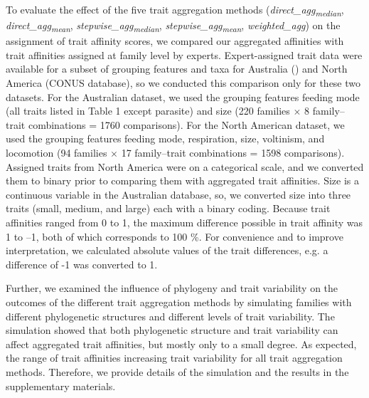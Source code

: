 \documentclass[12pt]{article}
\begin{document}
To evaluate the effect of the five trait aggregation methods
(\textit{direct\_agg\textsubscript{median}}, \textit{direct\_agg\textsubscript{mean}}, \textit{stepwise\_agg\textsubscript{median}}, \textit{stepwise\_agg\textsubscript{mean}}, \textit{weighted\_agg}) on the assignment of trait affinity scores, we compared our aggregated affinities with trait affinities assigned at family level by experts. Expert-assigned trait data were available for a subset of grouping features and taxa for Australia (\cite{chessman_dissolved-oxygen_2018}) and North America (CONUS database), so we conducted this comparison only for these two datasets. For the Australian dataset, we used the grouping features feeding mode (all traits listed in Table 1 except parasite) and size (220 families $\times$ 8 family–trait combinations = 1760 comparisons). For the North American dataset, we used the grouping features feeding mode, respiration, size, voltinism, and locomotion (94 families $\times$ 17 family–trait combinations = 1598 comparisons). Assigned traits from North America were on a categorical scale, and we converted them to binary prior to comparing them with aggregated trait affinities. Size is a continuous variable in the Australian database, so, we converted size into three traits (small, medium, and large) each with a binary coding. Because trait affinities ranged from 0 to 1, the maximum difference possible in trait affinity was 1 to –1, both of which corresponds to 100 \%. For convenience and to improve interpretation, we calculated absolute values of the trait differences, e.g. a difference of -1 was converted to 1.

Further, we examined the influence of phylogeny and trait variability on the outcomes of the different trait aggregation methods by simulating families with different phylogenetic structures and different levels of trait variability. The simulation showed that both phylogenetic structure and trait variability can affect aggregated trait affinities, but mostly only to a small degree. As expected, the range of trait affinities increasing trait variability for all trait aggregation methods. Therefore, we provide details of the simulation and the results in the supplementary materials.


\begin{figure}
  \centering
  
\end{figure}
\newpage
\begin{center}
\label{fig:data_proc_overview}
\end{center}
\end{document}
